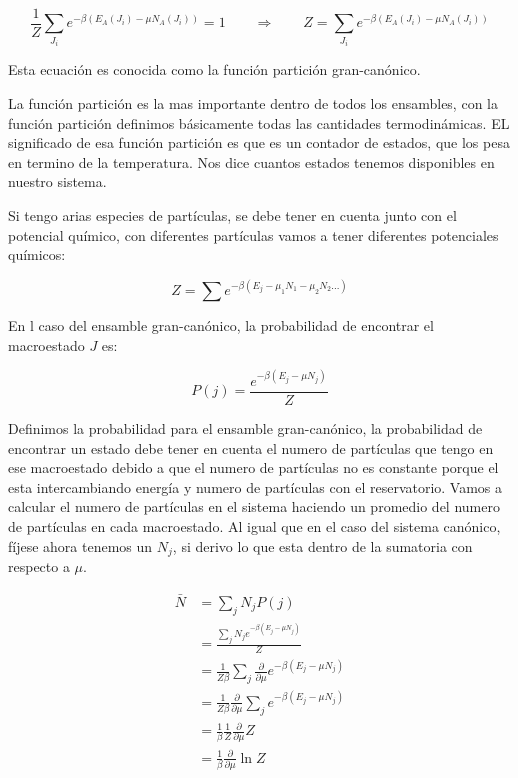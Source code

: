 \documentclass[11pt,fleqn]{book}
\begin{document}
\begin{equation}
    \frac{1}{Z}\sum_{J_{i}}e^{-\beta(E_{A}(J_{i})-\mu N_{A}(J_{i}))}=1\qquad\Longrightarrow\qquad Z=\sum_{J_{i}}e^{-\beta(E_{A}(J_{i})-\mu N_{A}(J_{i}))}
    \label{Eq. 5.7}
\end{equation}

Esta ecuación es conocida como la función partición gran-canónico.


La función partición es la mas importante dentro de todos los ensambles, con la función partición definimos básicamente todas las cantidades termodinámicas. EL significado de esa función partición es que es un contador de estados, que los pesa en termino de la temperatura. Nos dice cuantos estados tenemos disponibles en nuestro sistema. 

Si tengo arias especies de partículas, se debe tener en cuenta junto con el potencial químico, con diferentes partículas vamos a tener diferentes potenciales químicos:

\begin{equation*}
    Z=\sum e^{-\beta(E_{j}-\mu_{1}N_{1}-\mu_{2}N_{2}...)}
\end{equation*}

En l caso del ensamble gran-canónico, la probabilidad de encontrar el macroestado $J$ es:

\begin{equation}
    P(j)=\frac{e^{-\beta(E_{j}-\mu N_{j})}}{Z}
    \label{Eq. 5.8}
\end{equation}

Definimos la probabilidad para el ensamble gran-canónico, la probabilidad de encontrar un estado debe tener en cuenta el numero de partículas que tengo en ese macroestado debido a que el numero de partículas no es constante porque el esta intercambiando energía y numero de partículas con el reservatorio. Vamos a calcular el numero de partículas en el  sistema haciendo un promedio del numero de partículas en cada macroestado. Al igual que en el caso del sistema canónico, fíjese ahora tenemos un $N_{j}$, si derivo lo que esta dentro de la sumatoria con respecto a $\mu$. 


\begin{equation}
    \begin{split}
        \bar{N}&=\sum_{j}N_{j}P(j)\\
        &=\frac{\sum_{j}N_{j}e^{-\beta(E_{j}-\mu N_{j})}}{Z}\\
        &=\frac{1}{Z\beta}\sum_{j}\frac{\partial}{\partial\mu}e^{-\beta(E_{j}-\mu N_{j})}\\
        &=\frac{1}{Z\beta}\frac{\partial}{\partial\mu}\sum_{j}e^{-\beta(E_{j}-\mu N_{j})}\\
        &=\frac{1}{\beta}\frac{1}{Z}\frac{\partial}{\partial\mu}Z\\
        &=\frac{1}{\beta}\frac{\partial}{\partial\mu}\ln{Z}\\
    \end{split}
    \label{Eq. 5.9}
\end{equation}
\end{document}
